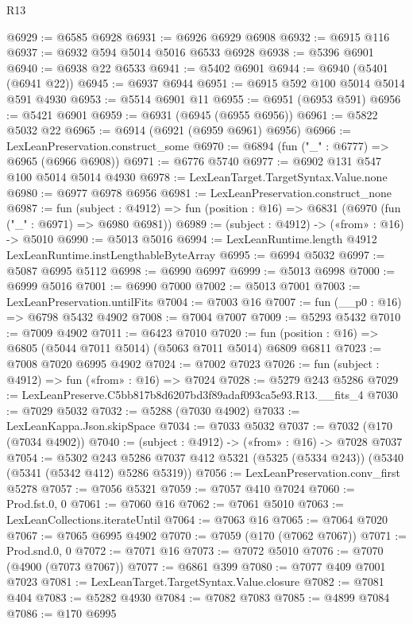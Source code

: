 \begin{lexlean}{R13}
\begin{coremodule}
@6929 := @6585 @6928
@6931 := @6926 @6929 @6908
@6932 := @6915 @116
@6937 := @6932 @594 @5014 @5016 @6533 @6928
@6938 := @5396 @6901
@6940 := @6938 @22 @6533
@6941 := @5402 @6901
@6944 := @6940 (@5401 (@6941 @22))
@6945 := @6937 @6944
@6951 := @6915 @592 @100 @5014 @5014 @591 @4930
@6953 := @5514 @6901 @11
@6955 := @6951 (@6953 @591)
@6956 := @5421 @6901
@6959 := @6931 (@6945 (@6955 @6956))
@6961 := @5822 @5032 @22
@6965 := @6914 (@6921 (@6959 @6961) @6956)
@6966 := LexLeanPreservation.construct_some
@6970 := @6894 (fun ("_" : @6777) => @6965 (@6966 @6908))
@6971 := @6776 @5740
@6977 := @6902 @131 @547 @100 @5014 @5014 @4930
@6978 := LexLeanTarget.TargetSyntax.Value.none
@6980 := @6977 @6978 @6956
@6981 := LexLeanPreservation.construct_none
@6987 := fun (subject : @4912) =>
  fun (position : @16) => @6831 (@6970 (fun ("_" : @6971) => @6980 @6981))
@6989 := (subject : @4912) -> («from» : @16) -> @5010
@6990 := @5013 @5016
@6994 := LexLeanRuntime.length @4912 LexLeanRuntime.instLengthableByteArray
@6995 := @6994 @5032
@6997 := @5087 @6995 @5112
@6998 := @6990 @6997
@6999 := @5013 @6998
@7000 := @6999 @5016
@7001 := @6990 @7000
@7002 := @5013 @7001
@7003 := LexLeanPreservation.untilFits
@7004 := @7003 @16
@7007 := fun (__p0 : @16) => @6798 @5432 @4902
@7008 := @7004 @7007
@7009 := @5293 @5432
@7010 := @7009 @4902
@7011 := @6423 @7010
@7020 := fun (position : @16) => @6805 (@5044 @7011 @5014) (@5063 @7011 @5014) @6809 @6811
@7023 := @7008 @7020 @6995 @4902
@7024 := @7002 @7023
@7026 := fun (subject : @4912) => fun («from» : @16) => @7024
@7028 := @5279 @243 @5286
@7029 := LexLeanPreserve.C5bb817b8d6207bd3f89adaf093ca5e93.R13.__fits_4
@7030 := @7029 @5032
@7032 := @5288 (@7030 @4902)
@7033 := LexLeanKappa.Json.skipSpace
@7034 := @7033 @5032
@7037 := @7032 (@170 (@7034 @4902))
@7040 := (subject : @4912) -> («from» : @16) -> @7028 @7037
@7054 := @5302
    @243
    @5286
    @7037
    @412
    @5321
    (@5325 (@5334 @243))
    (@5340 (@5341 (@5342 @412) @5286 @5319))
@7056 := LexLeanPreservation.conv_first @5278
@7057 := @7056 @5321
@7059 := @7057 @410 @7024
@7060 := Prod.fst.{0, 0}
@7061 := @7060 @16
@7062 := @7061 @5010
@7063 := LexLeanCollections.iterateUntil
@7064 := @7063 @16
@7065 := @7064 @7020
@7067 := @7065 @6995 @4902
@7070 := @7059 (@170 (@7062 @7067))
@7071 := Prod.snd.{0, 0}
@7072 := @7071 @16
@7073 := @7072 @5010
@7076 := @7070 (@4900 (@7073 @7067))
@7077 := @6861 @399
@7080 := @7077 @409 @7001 @7023
@7081 := LexLeanTarget.TargetSyntax.Value.closure
@7082 := @7081 @404
@7083 := @5282 @4930
@7084 := @7082 @7083
@7085 := @4899 @7084
@7086 := @170 @6995

\end{coremodule}
\end{lexlean}
